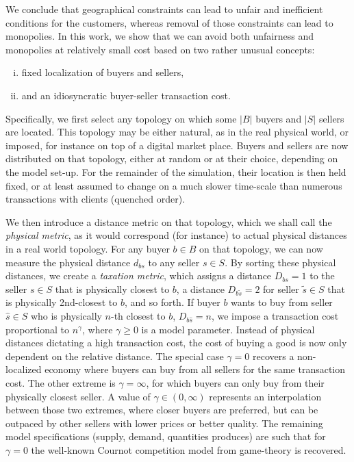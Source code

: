 \documentclass[a4paper,12pt]{article}
\begin{document}
We conclude that geographical constraints can lead to unfair and inefficient conditions for the customers, whereas removal of those constraints can lead to monopolies. 
In this work, we show that we can avoid both unfairness and monopolies at relatively small cost based on two rather unusual concepts:

\begin{enumerate}[(i),topsep=0pt,itemsep=-1ex,partopsep=1ex,parsep=1ex]
	
	\item fixed localization of buyers and sellers, 
	
	\item and an idiosyncratic buyer-seller transaction cost.

\end{enumerate}

Specifically, we first select any topology on which some $|B|$ buyers and $|S|$ sellers are located. 
This topology may be either natural, as in the real physical world, or imposed, for instance on top of a digital market place.  
Buyers and sellers are now distributed on that topology, either at random or at their choice, depending on the model set-up. 
For the remainder of the simulation, their location is then held fixed, or at least assumed to change on a much slower time-scale than numerous transactions with clients (quenched order). 

We then introduce a distance metric on that topology, which we shall call the \textit{physical metric}, as it would correspond (for instance) to actual physical distances in a real world topology. 
For any buyer $b \in B$ on that topology, we can now measure the physical distance $d_{bs}$ to any seller $s \in S$. 
By sorting these physical distances, we create a \textit{taxation metric}, which assigns a distance $D_{bs}=1$ to the seller $s \in S$ that is physically closest to $b$, a distance $D_{b\tilde{s}}=2$ for seller $\tilde{s} \in S$ that is physically 2nd-closest to $b$, and so forth. 
If buyer $b$ wants to buy from seller $\hat{s} \in S$ who is physically $n$-th closest to $b$, $D_{b \hat{s}}=n$, 
we impose a transaction cost proportional to $n^\gamma$, where $\gamma \geqslant 0$ is a model parameter. 
Instead of physical distances dictating a high transaction cost, the cost of buying a good is now only dependent on the relative distance. 
The special case $\gamma = 0$ recovers a non-localized economy where buyers can buy from all sellers for the same transaction cost. 
The other extreme is $\gamma=\infty$, for which buyers can only buy from their physically closest seller. 
A value of $\gamma \in (0, \infty)$ represents an interpolation between those two extremes, where closer buyers are preferred, but can be outpaced by other sellers with lower prices or better quality. 
The remaining model specifications (supply, demand, quantities produces) are such that for $\gamma = 0$ the well-known Cournot competition model from game-theory is recovered. 
\end{document}
